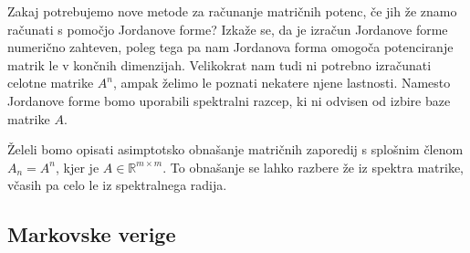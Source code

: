\documentclass[mat1]{fmfdelo}
\newcommand{\R}{\mathbb R}
\begin{document}
Zakaj potrebujemo nove metode za računanje matričnih potenc, če jih že znamo računati s pomočjo Jordanove forme? Izkaže se, da je izračun Jordanove forme numerično zahteven, poleg tega pa nam Jordanova forma omogoča potenciranje matrik le v končnih dimenzijah. Velikokrat nam tudi ni potrebno izračunati celotne matrike $A^n$, ampak želimo le poznati nekatere njene lastnosti. Namesto Jordanove forme bomo uporabili spektralni razcep, ki ni odvisen od izbire baze matrike $A$.

Želeli bomo opisati asimptotsko obnašanje matričnih zaporedij s splošnim členom $A_n = A^n$, kjer je $A \in \R^{m \times m}$. To obnašanje se lahko razbere že iz spektra matrike, včasih pa celo le iz spektralnega radija.

\subsection{Markovske verige}
\end{document}
